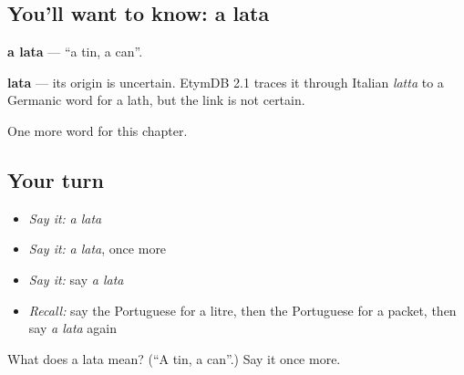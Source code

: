 \subsection*{You'll want to know: a lata}
\textbf{a lata} — \textquotedblleft{}a tin, a can\textquotedblright{}.

\begin{cousinweb}
\textbf{lata} — its origin is uncertain. EtymDB 2.1 traces it through Italian \emph{latta} to a Germanic word for a lath, but the link is not certain.
\end{cousinweb}

\begin{grammarlens}[title={What you've built}]
One more word for this chapter.
\end{grammarlens}

\subsection*{Your turn}
\begin{itemize}
\raggedright
  \item \emph{Say it:} \emph{a lata}
  \item \emph{Say it:} \emph{a lata}, once more
  \item \emph{Say it:} say \emph{a lata}
  \item \emph{Recall:} say the Portuguese for a litre, then the Portuguese for a packet, then say \emph{a lata} again
\end{itemize}

\begin{tcolorbox}[breakable,colback=teal!4,colframe=teal!35!black,title={Before you move on}]
What does a lata mean? (\textquotedblleft{}A tin, a can\textquotedblright{}.) Say it once more.
\end{tcolorbox}
